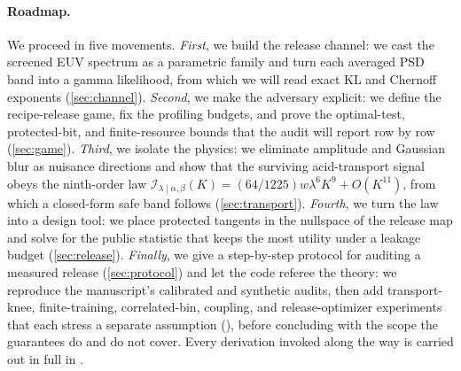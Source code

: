 \documentclass[11pt]{article}
\newcommand{\calI}{\mathcal I}
\begin{document}
\paragraph{Roadmap.}
We proceed in five movements. \emph{First}, we build the release channel: we cast the screened EUV spectrum as a parametric family and turn each averaged PSD band into a gamma likelihood, from which we will read exact KL and Chernoff exponents (\cref{sec:channel}). \emph{Second}, we make the adversary explicit: we define the recipe-release game, fix the profiling budgets, and prove the optimal-test, protected-bit, and finite-resource bounds that the audit will report row by row (\cref{sec:game}). \emph{Third}, we isolate the physics: we eliminate amplitude and Gaussian blur as nuisance directions and show that the surviving acid-transport signal obeys the ninth-order law $\calI_{\lambda\mid\alpha,\beta}(K)=(64/1225)w\lambda^6K^9+O(K^{11})$, from which a closed-form safe band follows (\cref{sec:transport}). \emph{Fourth}, we turn the law into a design tool: we place protected tangents in the nullspace of the release map and solve for the public statistic that keeps the most utility under a leakage budget (\cref{sec:release}). \emph{Finally}, we give a step-by-step protocol for auditing a measured release (\cref{sec:protocol}) and let the code referee the theory: we reproduce the manuscript's calibrated and synthetic audits, then add transport-knee, finite-training, correlated-bin, coupling, and release-optimizer experiments that each stress a separate assumption (), before concluding with the scope the guarantees do and do not cover. Every derivation invoked along the way is carried out in full in .
\end{document}
